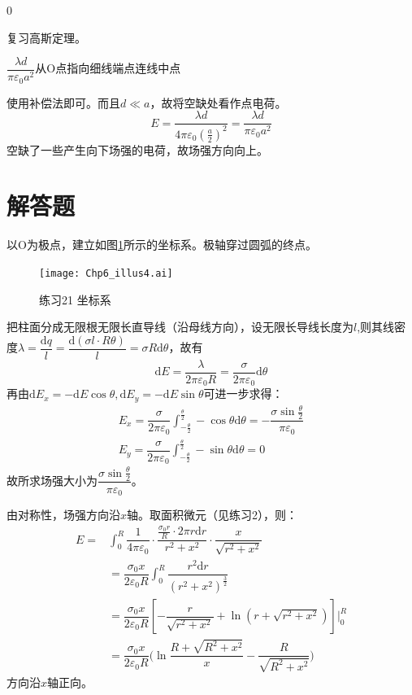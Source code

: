 \documentclass[b5paper,opensource,sourcefont,parskip]{qyxf-book}
\newcommand{\di}[1]{\mathrm{d}#1}
\begin{document}
0

\solve
复习高斯定理。

$\dfrac{\lambda d}{\pi\varepsilon_0 a^2}$\quad 从O点指向细线端点连线中点

\solve
使用补偿法即可。而且$d\ll a$，故将空缺处看作点电荷。
\[
E=\dfrac{\lambda d}{4\pi\varepsilon_0{(\frac{a}{2})}^2}=\dfrac{\lambda d}{\pi\varepsilon_0 a^2}
\]
空缺了一些产生向下场强的电荷，故场强方向向上。

\section{解答题}


\solve
以O为极点，建立如图\ref{fig:c6-t21}所示的坐标系。极轴穿过圆弧的终点。
\begin{figure}[!htbp]
	\centering
	\texttt{[image: Chp6\_illus4.ai]}
	\caption{练习21 坐标系}\label{fig:c6-t21}
\end{figure}
把柱面分成无限根无限长直导线（沿母线方向），设无限长导线长度为$l$,则其线密度$\lambda=\dfrac{\di{q}}{l}=\dfrac{\di{(\sigma l\cdot R\theta)}}{l}=\sigma R\di{\theta}$，故有
\[\di{E}=\dfrac{\lambda}{2\pi\varepsilon_0R}=\dfrac{\sigma}{2\pi\varepsilon_0}\di{\theta}\]
再由$\di{E_x}=-\di{E}\cos\theta,\di{E_y}=-\di{E}\sin\theta$可进一步求得：
\begin{gather*}
E_x=\dfrac{\sigma}{2\pi\varepsilon_0}\int_{-\frac{\theta}{2}}^{\frac{\theta}{2}}-\cos\theta\di{\theta}=-\dfrac{\sigma\sin\frac{\theta}{2}}{\pi\varepsilon_0}\\
E_y=\dfrac{\sigma}{2\pi\varepsilon_0}\int_{-\frac{\theta}{2}}^{\frac{\theta}{2}}-\sin\theta\di{\theta}=0
\end{gather*}
故所求场强大小为$\dfrac{\sigma\sin\frac{\theta}{2}}{\pi\varepsilon_0}$。


\solve
由对称性，场强方向沿$x$轴。取面积微元（见练习2），则：
\begin{align*}
E=&\int_0^R\dfrac{1}{4\pi\varepsilon_0}\cdot\dfrac{\frac{\sigma_0r}{R}\cdot 2\pi r\di{r}}{r^2+x^2}\cdot\dfrac{x}{\sqrt{r^2+x^2}}\\
&=\dfrac{\sigma_0x}{2\varepsilon_0R}\int_0^R\dfrac{r^2\di{r}}{{(r^2+x^2)}^\frac{3}{2}}\\
&=\dfrac{\sigma_0x}{2\varepsilon_0R}[-\dfrac{r}{\sqrt{r^2+x^2}}+\ln(r+\sqrt{r^2+x^2})]\Big|_0^R\\
&=\dfrac{\sigma_0x}{2\varepsilon_0R}\big(\ln\dfrac{R+\sqrt{R^2+x^2}}{x}-\dfrac{R}{\sqrt{R^2+x^2}}\big)
\end{align*}
方向沿$x$轴正向。
\end{document}
